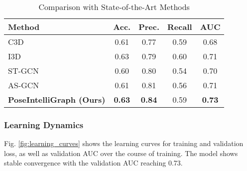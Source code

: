 \documentclass[conference]{IEEEtran}
\begin{document}
\begin{table}[htbp]
\caption{Comparison with State-of-the-Art Methods}
\begin{center}
\begin{tabular}{|l|c|c|c|c|}
\hline
\textbf{Method} & \textbf{Acc.} & \textbf{Prec.} & \textbf{Recall} & \textbf{AUC} \\
\hline
C3D \cite{wu2020not} & 0.61 & 0.77 & 0.59 & 0.68 \\
\hline
I3D \cite{carreira2017quo} & 0.63 & 0.79 & 0.60 & 0.71 \\
\hline
ST-GCN \cite{yan2018spatial} & 0.60 & 0.80 & 0.54 & 0.70 \\
\hline
AS-GCN \cite{li2019actional} & 0.61 & 0.81 & 0.56 & 0.71 \\
\hline
\textbf{PoseIntelliGraph (Ours)} & \textbf{0.63} & \textbf{0.84} & 0.59 & \textbf{0.73} \\
\hline
\end{tabular}
\label{tab:comparison}
\end{center}
\end{table}

\subsubsection{Learning Dynamics}
Fig. \ref{fig:learning_curves} shows the learning curves for training and validation loss, as well as validation AUC over the course of training. The model shows stable convergence with the validation AUC reaching 0.73.
\end{document}
